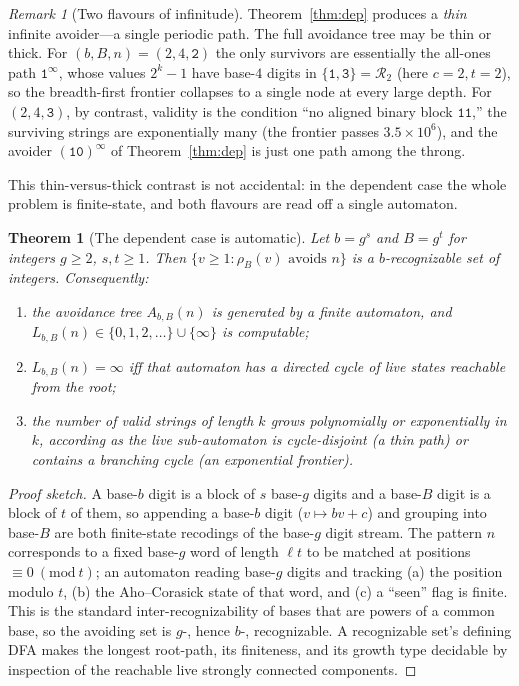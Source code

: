 \documentclass[11pt]{article}
\theoremstyle{plain}
\newtheorem{theorem}{Theorem}
\theoremstyle{definition}
\theoremstyle{remark}
\newtheorem{remark}{Remark}
\newcommand{\Lbb}{L_{b,B}}
\begin{document}
\begin{remark}[Two flavours of infinitude]
Theorem~\ref{thm:dep} produces a \emph{thin} infinite avoider---a single periodic path. The full avoidance tree may be thin or thick. For $(b,B,n)=(2,4,\texttt{2})$ the only survivors are essentially the all-ones path $\texttt{1}^{\infty}$, whose values $2^{k}-1$ have base-$4$ digits in $\{\texttt{1},\texttt{3}\}=\mathcal R_2$ (here $c=2,t=2$), so the breadth-first frontier collapses to a single node at every large depth. For $(2,4,\texttt{3})$, by contrast, validity is the condition ``no aligned binary block $\texttt{11}$,'' the surviving strings are exponentially many (the frontier passes $3.5\times10^{6}$), and the avoider $(\texttt{10})^{\infty}$ of Theorem~\ref{thm:dep} is just one path among the throng.
\end{remark}

This thin-versus-thick contrast is not accidental: in the dependent case the whole problem is finite-state, and both flavours are read off a single automaton.

\begin{theorem}[The dependent case is automatic]\label{thm:auto}
Let $b=g^{s}$ and $B=g^{t}$ for integers $g\ge2$, $s,t\ge1$. Then $\{v\ge1:\rho_B(v)\text{ avoids }n\}$ is a $b$-recognizable set of integers. Consequently:
\begin{enumerate}\itemsep1pt
\item[(i)] the avoidance tree $A_{b,B}(n)$ is generated by a finite automaton, and $\Lbb(n)\in\{0,1,2,\dots\}\cup\{\infty\}$ is \emph{computable};
\item[(ii)] $\Lbb(n)=\infty$ iff that automaton has a directed cycle of live states reachable from the root;
\item[(iii)] the number of valid strings of length $k$ grows polynomially or exponentially in $k$, according as the live sub-automaton is cycle-disjoint (a thin path) or contains a branching cycle (an exponential frontier).
\end{enumerate}
\end{theorem}

\begin{proof}[Proof sketch]
A base-$b$ digit is a block of $s$ base-$g$ digits and a base-$B$ digit is a block of $t$ of them, so appending a base-$b$ digit ($v\mapsto bv+c$) and grouping into base-$B$ are both finite-state recodings of the base-$g$ digit stream. The pattern $n$ corresponds to a fixed base-$g$ word of length $\ell t$ to be matched at positions $\equiv0\ (\mathrm{mod}\ t)$; an automaton reading base-$g$ digits and tracking (a) the position modulo $t$, (b) the Aho--Corasick state of that word, and (c) a ``seen'' flag is finite. This is the standard inter-recognizability of bases that are powers of a common base, so the avoiding set is $g$-, hence $b$-, recognizable. A recognizable set's defining DFA makes the longest root-path, its finiteness, and its growth type decidable by inspection of the reachable live strongly connected components.
\end{proof}
\end{document}
